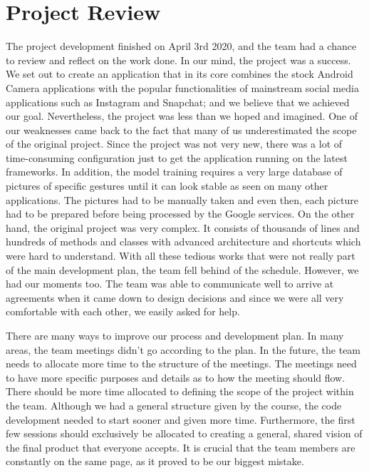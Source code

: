 \documentclass{article}
\begin{document}
\section{Project Review}
{\color{red}
The project development finished on April 3rd 2020, and the team had a chance to review and reflect on the work done. In our mind, the project was a success. We set out to create an application that in its core combines the stock Android Camera applications with the popular functionalities of mainstream social media applications such as Instagram and Snapchat; and we believe that we achieved our goal. Nevertheless, the project was less than we hoped and imagined. One of our weaknesses came back to the fact that many of us underestimated the scope of the original project. Since the project was not very new, there was a lot of time-consuming configuration just to get the application running on the latest frameworks. In addition, the model training requires a very large database of pictures of specific gestures until it can look stable as seen on many other applications. The pictures had to be manually taken and even then, each picture had to be prepared before being processed by the Google services. On the other hand, the original project was very complex. It consists of thousands of lines and hundreds of methods and classes with advanced architecture and shortcuts which were hard to understand. With all these tedious works that were not really part of the main development plan, the team fell behind of the schedule. However, we had our moments too. The team was able to communicate well to arrive at agreements when it came down to design decisions and since we were all very comfortable with each other, we easily asked for help. 

There are many ways to improve our process and development plan. In many areas, the team meetings didn’t go according to the plan. In the future, the team needs to allocate more time to the structure of the meetings. The meetings need to have more specific purposes and details as to how the meeting should flow. There should be more time allocated to defining the scope of the project within the team. Although we had a general structure given by the course, the code development needed to start sooner and given more time. Furthermore, the first few sessions should exclusively be allocated to creating a general, shared vision of the final product that everyone accepts. It is crucial that the team members are constantly on the same page, as it proved to be our biggest mistake.

}
\end{document}
